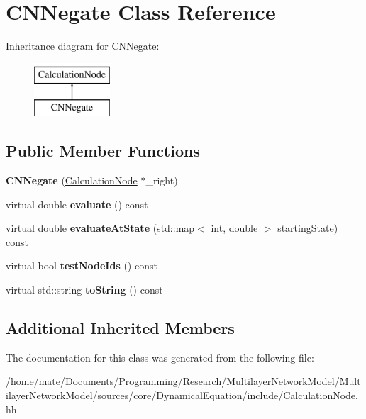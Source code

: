 \hypertarget{classCNNegate}{}\section{C\+N\+Negate Class Reference}
\label{classCNNegate}
Inheritance diagram for C\+N\+Negate\+:\begin{figure}[H]
\begin{center}
\leavevmode
\includegraphics[height=2.000000cm]{classCNNegate}
\end{center}
\end{figure}
\subsection*{Public Member Functions}
\begin{DoxyCompactItemize}
\item 
{\bfseries C\+N\+Negate} (\hyperlink{classCalculationNode}{Calculation\+Node} $\ast$\+\_\+right)\hypertarget{classCNNegate_a7ed8699cfcdf9e6cb4e08c2f386ec8aa}{}\label{classCNNegate_a7ed8699cfcdf9e6cb4e08c2f386ec8aa}

\item 
virtual double {\bfseries evaluate} () const \hypertarget{classCNNegate_ad8742ef807da75fea0d512467d5331cd}{}\label{classCNNegate_ad8742ef807da75fea0d512467d5331cd}

\item 
virtual double {\bfseries evaluate\+At\+State} (std\+::map$<$ int, double $>$ starting\+State) const \hypertarget{classCNNegate_a466eaeee589ea62f77dab230b4da9ab7}{}\label{classCNNegate_a466eaeee589ea62f77dab230b4da9ab7}

\item 
virtual bool {\bfseries test\+Node\+Ids} () const \hypertarget{classCNNegate_ad03475bf5217a1673057e74f60b7b7fe}{}\label{classCNNegate_ad03475bf5217a1673057e74f60b7b7fe}

\item 
virtual std\+::string {\bfseries to\+String} () const \hypertarget{classCNNegate_a8cf6b243b14cfbeb28434f301303d1a9}{}\label{classCNNegate_a8cf6b243b14cfbeb28434f301303d1a9}

\end{DoxyCompactItemize}
\subsection*{Additional Inherited Members}


The documentation for this class was generated from the following file\+:\begin{DoxyCompactItemize}
\item 
/home/mate/\+Documents/\+Programming/\+Research/\+Multilayer\+Network\+Model/\+Multilayer\+Network\+Model/sources/core/\+Dynamical\+Equation/include/Calculation\+Node.\+hh\end{DoxyCompactItemize}
